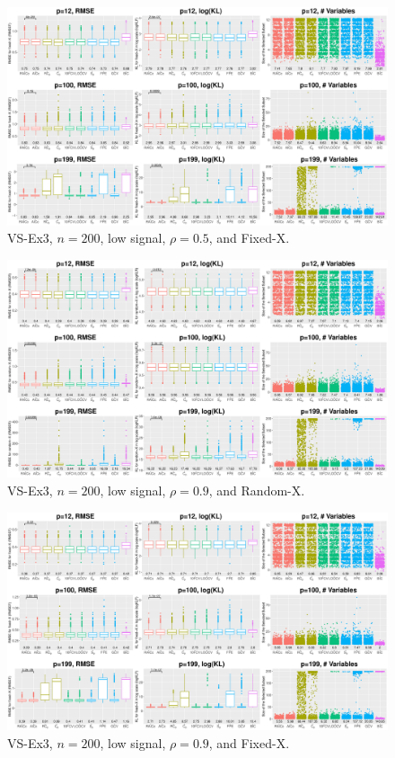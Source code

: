 \begin{figure}[!ht]
\centering
\includegraphics[width=\textwidth]{figures/supplement/fixedx_VS-Ex3_n200_lsnr_rho05.eps}
\caption{VS-Ex3, $n=200$, low signal, $\rho=0.5$, and Fixed-X.}
\end{figure}
\clearpage
\begin{figure}[!ht]
\centering
\includegraphics[width=\textwidth]{figures/supplement/randomx_VS-Ex3_n200_lsnr_rho09.eps}
\caption{VS-Ex3, $n=200$, low signal, $\rho=0.9$, and Random-X.}
\end{figure}
\begin{figure}[!ht]
\centering
\includegraphics[width=\textwidth]{figures/supplement/fixedx_VS-Ex3_n200_lsnr_rho09.eps}
\caption{VS-Ex3, $n=200$, low signal, $\rho=0.9$, and Fixed-X.}
\end{figure}
